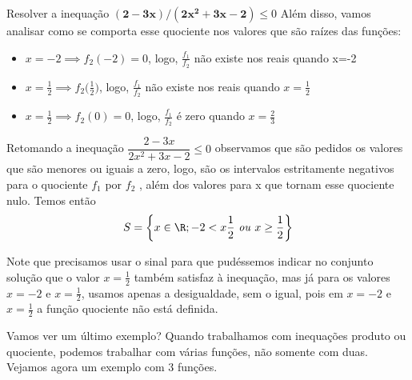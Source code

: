 \begin{example}{Resolver a inequação $\bm{(2-3x)/(2x^2+3x-2)}\leq0$}
Além disso, vamos analisar como se comporta esse quociente nos valores que são raízes das funções:

\begin{itemize}
\item $x=-2\implies f_2(-2)=0$, logo, $\frac{f_1}{f_2}$ não existe nos reais quando x=-2
\item $x=\frac{1}{2}\implies f_2\big(\frac{1}{2}\big)$, logo, $\frac{f_1}{f_2}$ não existe nos reais quando $x=\frac{1}{2}$
\item $x=\frac{1}{2}\implies f_2(0) = 0$, logo, $\frac{f_1}{f_2}$ é zero quando $x=\frac{2}{3}$
\end{itemize}

Retomando a inequação $\dfrac{2-3x}{2x^2+3x-2}\leq 0$ observamos que são pedidos os valores que são menores ou iguais a zero, logo, são os intervalos estritamente negativos para o quociente $f_1$ por $f_2$  , além dos valores para x que tornam esse quociente nulo. Temos então 
\begin{equation*}
S=\left\{x\in\R;-2<x\frac{1}{2}\text{ \textit{ou} }x\geq\frac{1}{2}\right\}
\end{equation*}
\end{example}

\begin{observation}{}
Note que precisamos usar o sinal   para que pudéssemos indicar no conjunto solução que o valor $x=\frac{1}{2}$ também satisfaz à inequação, mas já para os valores $x=-2$ e $x=\frac{1}{2}$, usamos apenas a desigualdade, sem o igual, pois em $x=-2$ e $x=\frac{1}{2}$ a função quociente não está definida.
\end{observation}

Vamos ver um  último exemplo? Quando trabalhamos com inequações produto ou quociente, podemos trabalhar com várias funções, não somente com duas. Vejamos agora um exemplo com $3$ funções.

